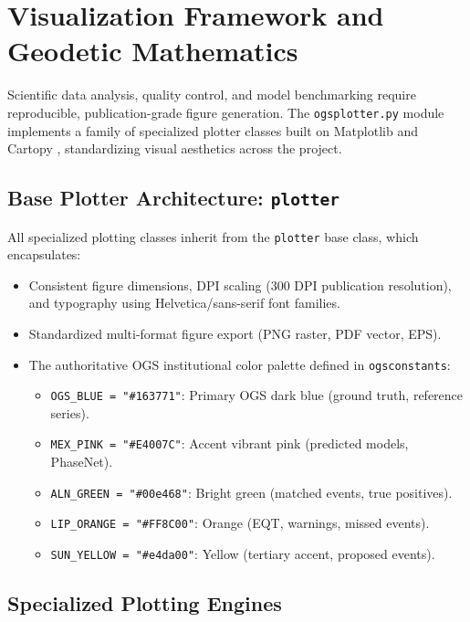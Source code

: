\section{Visualization Framework and Geodetic Mathematics}
\label{sec:visualization_framework}

Scientific data analysis, quality control, and model benchmarking
require reproducible, publication-grade figure generation. The
\texttt{ogsplotter.py} module implements a family of specialized
plotter classes built on Matplotlib \parencite{Matplotlib} and Cartopy
\parencite{Cartopy}, standardizing visual aesthetics across the project.

\subsection{Base Plotter Architecture: \texttt{plotter}}
\label{subsec:base_plotter}

All specialized plotting classes inherit from the \texttt{plotter}
base class, which encapsulates:
\begin{itemize}
  \item Consistent figure dimensions, DPI scaling (300 DPI
    publication resolution), and typography using
    Helvetica/sans-serif font families.
  \item Standardized multi-format figure export (PNG raster, PDF
    vector, EPS).
  \item The authoritative \ac{OGS} institutional color palette defined
    in \texttt{ogsconstants}:
    \begin{itemize}
      \item \texttt{OGS\_BLUE = "\#163771"}: Primary \ac{OGS} dark blue
        (ground truth, reference series).
      \item \texttt{MEX\_PINK = "\#E4007C"}: Accent vibrant pink
        (predicted models, \ac{PhaseNet}).
      \item \texttt{ALN\_GREEN = "\#00e468"}: Bright green
        (matched events, true positives).
      \item \texttt{LIP\_ORANGE = "\#FF8C00"}: Orange
        (\ac{EQT}, warnings, missed events).
      \item \texttt{SUN\_YELLOW = "\#e4da00"}: Yellow (tertiary
        accent, proposed events).
    \end{itemize}
\end{itemize}

\subsection{Specialized Plotting Engines}
\label{subsec:specialized_plotters}

